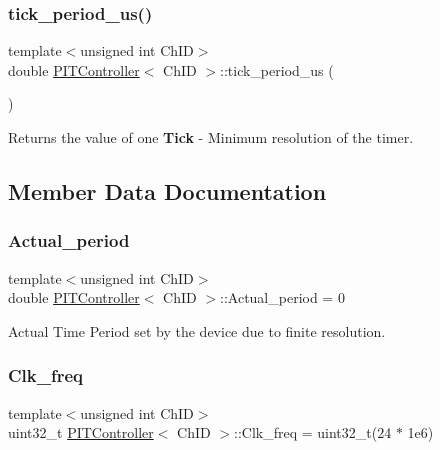 \subsubsection{\texorpdfstring{tick\+\_\+period\+\_\+us()}{tick\_period\_us()}}
{\footnotesize\ttfamily template$<$unsigned int Ch\+ID$>$ \\
double \hyperlink{classPITController}{P\+I\+T\+Controller}$<$ Ch\+ID $>$\+::tick\+\_\+period\+\_\+us (\begin{DoxyParamCaption}{ }\end{DoxyParamCaption})\hspace{0.3cm}{\ttfamily [inline]}}



Returns the value of one {\bfseries Tick} -\/ Minimum resolution of the timer. 



\subsection{Member Data Documentation}
\mbox{\label{classPITController_a549601e7c66941d7872a6e7d38ed9563}} 
\subsubsection{\texorpdfstring{Actual\+\_\+period}{Actual\_period}}
{\footnotesize\ttfamily template$<$unsigned int Ch\+ID$>$ \\
double \hyperlink{classPITController}{P\+I\+T\+Controller}$<$ Ch\+ID $>$\+::Actual\+\_\+period = 0}



Actual Time Period set by the device due to finite resolution. 

\mbox{\label{classPITController_ae3d74bb18e5b22769e895f592cb16129}} 
\subsubsection{\texorpdfstring{Clk\+\_\+freq}{Clk\_freq}}
{\footnotesize\ttfamily template$<$unsigned int Ch\+ID$>$ \\
uint32\+\_\+t \hyperlink{classPITController}{P\+I\+T\+Controller}$<$ Ch\+ID $>$\+::Clk\+\_\+freq = uint32\+\_\+t(24 $\ast$ 1e6)}



